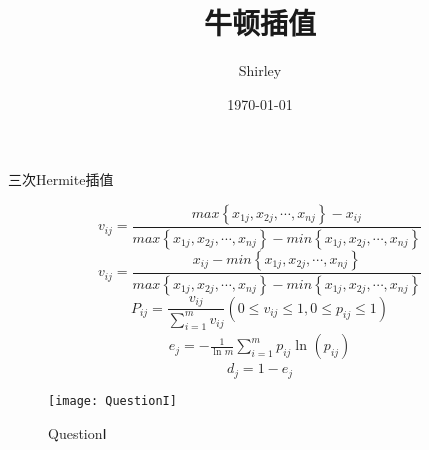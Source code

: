 \documentclass{ctexart}%
\title{\kaishu 牛顿插值}
\author{Shirley}
\date{\today}
\begin{document}
	三次Hermite插值
	
	\begin{equation}
		v_{ij}=\frac{max\left \{{x_{1j},x_{2j},\cdots ,x_{nj}}  \right \}-x_{ij} }{max\left \{{x_{1j},x_{2j},\cdots ,x_{nj}}  \right \}-min\left \{{x_{1j},x_{2j},\cdots ,x_{nj}}  \right \}} 
	\end{equation}
	\begin{equation}
		v_{ij}=\frac{x_{ij}-min\left \{{x_{1j},x_{2j},\cdots ,x_{nj}}  \right \}}{max\left \{{x_{1j},x_{2j},\cdots ,x_{nj}}  \right \}-min\left \{{x_{1j},x_{2j},\cdots ,x_{nj}}  \right \}} 
	\end{equation}
	\begin{equation}
		P_{ij}=\frac{v_{ij}}{\sum_{i=1}^{m}v_{ij} } (0\le v_{ij} \le 1,0\le p_{ij} \le 1)
	\end{equation}
	\begin{equation}
		\begin{aligned}
			e_{j}=-\frac{1}{\ln_{}{m}}\sum_{i=1}^{m}p_{ij}\ln_{}{(p_{ij})} 
		\end{aligned}
	\end{equation}
	\begin{equation}
		d_{j}=1-e_{j}   
	\end{equation}


	\begin{figure}[h]
		\centering
		\texttt{[image: QuestionI]}
		\caption{QuestionⅠ}
	\end{figure}
	
\end{document}
